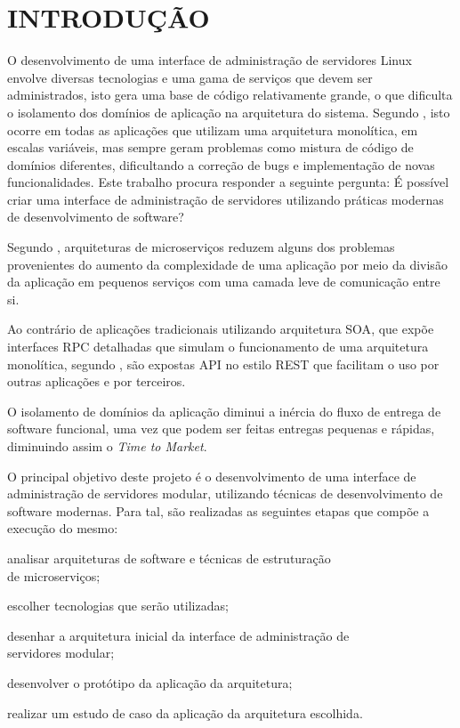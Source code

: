 \chapter{INTRODUÇÃO}
\label{chp:intro}

O desenvolvimento de uma interface de administração de servidores Linux
envolve diversas tecnologias e uma gama de serviços que devem ser
administrados, isto gera uma base de código relativamente grande, o que
dificulta o isolamento dos domínios de aplicação na arquitetura
do sistema. Segundo , isto ocorre em todas as aplicações
que utilizam uma arquitetura monolítica, em escalas variáveis, mas sempre
geram problemas como mistura de código de domínios diferentes, dificultando
a correção de bugs e implementação de novas funcionalidades. Este trabalho
procura responder a seguinte pergunta: É possível criar uma interface de
administração de servidores utilizando práticas modernas de desenvolvimento
de software?

Segundo , arquiteturas de microserviços reduzem
alguns dos problemas provenientes do aumento da complexidade de uma aplicação
por meio da divisão da aplicação em pequenos serviços com uma camada leve
de comunicação entre si.

Ao contrário de aplicações tradicionais utilizando arquitetura
\ac{SOA}, que expõe interfaces \ac{RPC} detalhadas que simulam o funcionamento
de uma arquitetura monolítica, segundo , são expostas
\ac{API} no estilo \ac{REST} que facilitam o uso por outras aplicações e
por terceiros.

O isolamento de domínios da aplicação diminui a inércia do fluxo de entrega
de software funcional, uma vez que podem ser feitas entregas pequenas e
rápidas, diminuindo assim o \emph{Time to Market}.

O principal objetivo deste projeto é o desenvolvimento de uma interface
de administração de servidores modular, utilizando técnicas de desenvolvimento
de software modernas. Para tal, são realizadas as seguintes etapas que compõe
a execução do mesmo:

\begin{alineas}
  \item analisar arquiteturas de software e técnicas de estruturação \\
    de microserviços;
  \item escolher tecnologias que serão utilizadas;
  \item desenhar a arquitetura inicial da interface de administração de \\
    servidores modular;
  \item desenvolver o protótipo da aplicação da arquitetura;
  \item realizar um estudo de caso da aplicação da arquitetura escolhida.
\end{alineas}

